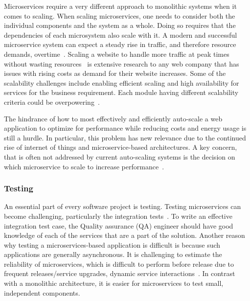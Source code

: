 \par Microservices require a very different approach to monolithic systems when it comes to scaling. When scaling microservices, one needs to consider both the individual components and the system as a whole. Doing so requires that the dependencies of each microsystem also scale with it. %
A modern and successful microservice system can expect a steady rise in traffic, and therefore resource demands, overtime~\cite{Etsy, Soundcloud}. 
Scaling a website to handle more traffic at peak times without wasting resources~\cite{McElhiney2018} is extensive research to any web company that has issues with rising costs as demand for their website increases. Some of the scalability challenges include enabling efficient scaling and high availability for services for the business requirement. Each module having different scalability criteria could be overpowering~\cite{khan2020}. 

\par The hindrance of how to most effectively and efficiently auto-scale a web application to optimize for performance while reducing costs and energy usage is still a hurdle. In particular, this problem has new relevance due to the continued rise of internet of things and microservice-based architectures. A key concern, that is often not addressed by current auto-scaling systems is the decision on which microservice to scale to increase performance~\cite{coulson2020}.



\subsubsection{Testing}%

An essential part of every software project is testing. Testing microservices can become challenging, particularly the integration tests~\cite{Dmitrii2019}. To write an effective integration test case, the Quality assurance (QA) engineer should have good knowledge of each of the services that are a part of the solution. Another reason why testing a microservices-based application is difficult is because such applications are generally asynchronous. It is challenging to estimate the reliability of microservices, which is difficult to perform before release due to frequent releases/service upgrades, dynamic service interactions~\cite{Russo2020}. In contrast with a monolithic architecture, it is easier for microservices to test small, independent components. 

